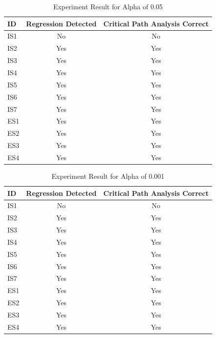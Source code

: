 \documentclass[conference]{configs/IEEEtran}
\begin{document}
\begin{table}[!htb]
	\caption{Experiment Result for Alpha of 0.05}
	\label{test-2}
	\centering
	\begin{tabular}{|l|c|c|}
		\hline
		\textbf{ID} & \multicolumn{1}{l|}{\textbf{Regression Detected}} & \multicolumn{1}{l|}{\textbf{Critical Path Analysis Correct}} \\ \hline
		IS1 & No & No \\ \hline
		IS2 & Yes & Yes \\ \hline
		IS3 & Yes & Yes \\ \hline
		IS4 & Yes & Yes \\ \hline
		IS5 & Yes & Yes \\ \hline
		IS6 & Yes & Yes \\ \hline
		IS7 & Yes & Yes \\ \hline
		ES1 & Yes & Yes \\ \hline
		ES2 & Yes & Yes \\ \hline
		ES3 & Yes & Yes \\ \hline
		ES4 & Yes & Yes \\ \hline
	\end{tabular}
\end{table}
\begin{table}[!htb]
	\caption{Experiment Result for Alpha of 0.001}
	\label{test-3}
	\centering
	\begin{tabular}{|l|c|c|}
		\hline
		\textbf{ID} & \multicolumn{1}{l|}{\textbf{Regression Detected}} & \multicolumn{1}{l|}{\textbf{Critical Path Analysis Correct}} \\ \hline
		IS1 & No & No \\ \hline
		IS2 & Yes & Yes \\ \hline
		IS3 & Yes & Yes \\ \hline
		IS4 & Yes & Yes \\ \hline
		IS5 & Yes & Yes \\ \hline
		IS6 & Yes & Yes \\ \hline
		IS7 & Yes & Yes \\ \hline
		ES1 & Yes & Yes \\ \hline
		ES2 & Yes & Yes \\ \hline
		ES3 & Yes & Yes \\ \hline
		ES4 & Yes & Yes \\ \hline
	\end{tabular}
\end{table}

\end{document}
